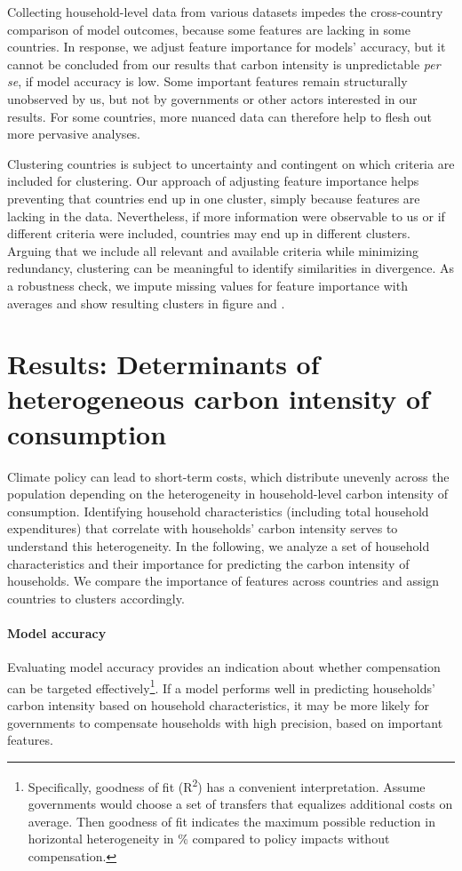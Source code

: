 \documentclass[12pt, a4paper]{article}
\begin{document}
Collecting household-level data from various datasets impedes the cross-country comparison of model outcomes, because some features are lacking in some countries. In response, we adjust feature importance for models' accuracy, but it cannot be concluded from our results that carbon intensity is unpredictable \textit{per se}, if model accuracy is low. Some important features remain structurally unobserved by us, but not by governments or other actors interested in our results. For some countries, more nuanced data can therefore help to flesh out more pervasive analyses.

Clustering countries is subject to uncertainty and contingent on which criteria are included for clustering. Our approach of adjusting feature importance helps preventing that countries end up in one cluster, simply because features are lacking in the data. Nevertheless, if more information were observable to us or if different criteria were included, countries may end up in different clusters. Arguing that we include all relevant and available criteria while minimizing redundancy, clustering can be meaningful to identify similarities in divergence. As a robustness check, we impute missing values for feature importance with averages and show resulting clusters in figure  and .

\section{Results: Determinants of heterogeneous carbon intensity of consumption} \label{sec:results}

Climate policy can lead to short-term costs, which distribute unevenly across the population depending on the heterogeneity in household-level carbon intensity of consumption. Identifying household characteristics (including total household expenditures) that correlate with households' carbon intensity serves to understand this heterogeneity. In the following, we analyze a set of household characteristics and their importance for predicting the carbon intensity of households. We compare the importance of features across countries and assign countries to clusters accordingly.

\paragraph{Model accuracy} 
Evaluating model accuracy provides an indication about whether compensation can be targeted effectively\footnote{Specifically, goodness of fit (R\textsuperscript{2}) has a convenient interpretation. Assume governments would choose a set of transfers that equalizes additional costs on average. Then goodness of fit indicates the maximum possible reduction in horizontal heterogeneity in \% compared to policy impacts without compensation.}. If a model performs well in predicting households' carbon intensity based on household characteristics, it may be more likely for governments to compensate households with high precision, based on important features. 
\end{document}
